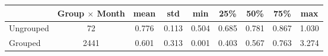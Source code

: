 \begin{tabular}{lcccccccc}
\toprule
{} &  Group $\times$ Month &   mean &    std &    min &    25\% &    50\% &    75\% &    max \\
\midrule
Ungrouped &                      72 &  0.776 &  0.113 &  0.504 &  0.685 &  0.781 &  0.867 &  1.030 \\
Grouped   &                    2441 &  0.601 &  0.313 &  0.001 &  0.403 &  0.567 &  0.763 &  3.274 \\
\bottomrule
\end{tabular}
